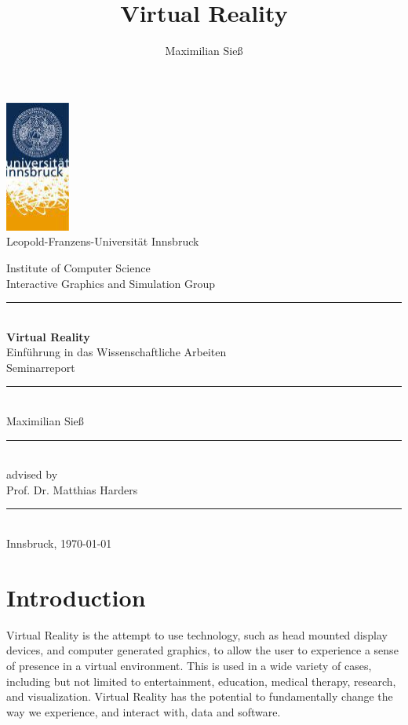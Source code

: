 \documentclass[11pt]{article}
\newcommand{\whitespace}{\rule{\linewidth}{0.0mm}}
\begin{document}
\title{Virtual Reality}
\author{Maximilian Sieß}

\begin{titlepage}
	\begin{center}
		\includegraphics[scale=1]{images/uibk} \\
		Leopold-Franzens-Universität Innsbruck
		\linebreak 

		Institute of Computer Science \\
		Interactive Graphics and Simulation Group
	
		\whitespace \\[2.0cm]
		\LARGE \textbf{Virtual Reality}\\
		\normalsize Einführung in das Wissenschaftliche Arbeiten\\
		Seminarreport
	
		\whitespace \\[0.8cm]
		Maximilian Sieß
		
		\whitespace \\[2.0cm]
		advised by\\
		Prof. Dr. Matthias Harders
		
		\whitespace \\[4.0cm]
		Innsbruck, \today

	\end{center}
\end{titlepage}


\tableofcontents


\newpage
\section{Introduction}
Virtual Reality is the attempt to use technology, such as head mounted display devices, and computer generated graphics, to allow the user to experience a sense of presence in a virtual environment.  This is used in a wide variety of cases, including but not limited to entertainment, education, medical therapy, research, and visualization. Virtual Reality has the potential to fundamentally change the way we experience, and interact with, data and software.
\end{document}
